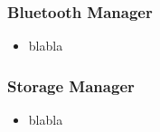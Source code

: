 \documentclass{beamer}
\begin{document}

\begin{frame}
\frametitle{Bluetooth Manager}
\begin{itemize}
  \item blabla
\end{itemize}
\end{frame}

\begin{frame}
\frametitle{Storage Manager}
\begin{itemize}
  \item blabla
\end{itemize}
\end{frame}
\end{document}
